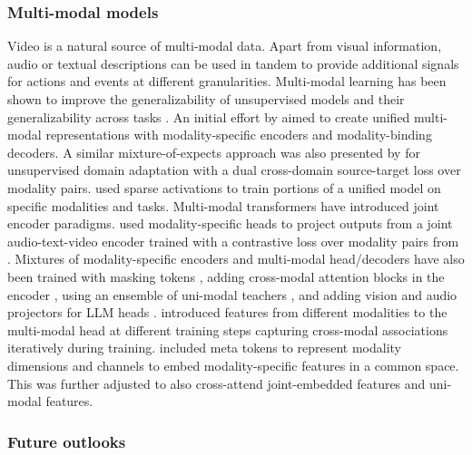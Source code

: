 \subsubsection{Multi-modal models}

Video is a natural source of multi-modal data. Apart from visual information, audio or textual descriptions can be used in tandem to provide additional signals for actions and events at different granularities. Multi-modal learning has been shown to improve the generalizability of unsupervised models \citep{ngiam2011multimodal} and their generalizability across tasks \citep{paredes2012exploiting}. An initial effort by \citet{kaiser2017one} aimed to create unified multi-modal representations with modality-specific encoders and modality-binding decoders. A similar mixture-of-expects approach was also presented by \citet{munro2020multi} for unsupervised domain adaptation with a dual cross-domain source-target loss over modality pairs. \citet{dai2022one} used sparse activations to train portions of a unified model on specific modalities and tasks. Multi-modal transformers have introduced joint encoder paradigms. \citet{akbari2021vatt} used modality-specific heads to project outputs from a joint audio-text-video encoder trained with a contrastive loss over modality pairs from \citet{miech2020end}. Mixtures of modality-specific encoders and multi-modal head/decoders have also been trained with masking tokens \citep{zellers2022merlot}, adding cross-modal attention blocks in the encoder \citep{recasens2023zorro}, using an ensemble of uni-modal teachers \citep{radevski2023multimodal}, and adding vision and audio projectors for LLM heads \citep{zhang2023video}. \citet{zhang2024multimodal} introduced features from different modalities to the multi-modal head at different training steps capturing cross-modal associations iteratively during training. \citet{srivastava2024omnivec} included meta tokens to represent modality dimensions and channels to embed modality-specific features in a common space. This was further adjusted \citep{srivastava2024omnivec2} to also cross-attend joint-embedded features and uni-modal features.





\subsubsection{Future outlooks}

